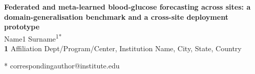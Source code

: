 \documentclass[10pt,letterpaper]{article}
\begin{document}
\vspace*{0.2in}

\begin{flushleft}
{\Large
\textbf{Federated and meta-learned blood-glucose forecasting across sites: a domain-generalisation benchmark and a cross-site deployment prototype}
}
\newline
\\
Name1 Surname\textsuperscript{1*}
\\
\bigskip
\textbf{1} Affiliation Dept/Program/Center, Institution Name, City, State, Country
\\
\bigskip

* correspondingauthor@institute.edu

\end{flushleft}

\end{document}
